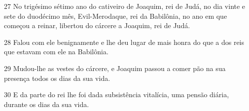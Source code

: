 \par 27 No trigésimo sétimo ano do cativeiro de Joaquim, rei de Judá, no dia vinte e sete do duodécimo mês, Evil-Merodaque, rei da Babilônia, no ano em que começou a reinar, libertou do cárcere a Joaquim, rei de Judá.
\par 28 Falou com ele benignamente e lhe deu lugar de mais honra do que a dos reis que estavam com ele na Babilônia.
\par 29 Mudou-lhe as vestes do cárcere, e Joaquim passou a comer pão na sua presença todos os dias da sua vida.
\par 30 E da parte do rei lhe foi dada subsistência vitalícia, uma pensão diária, durante os dias da sua vida.


